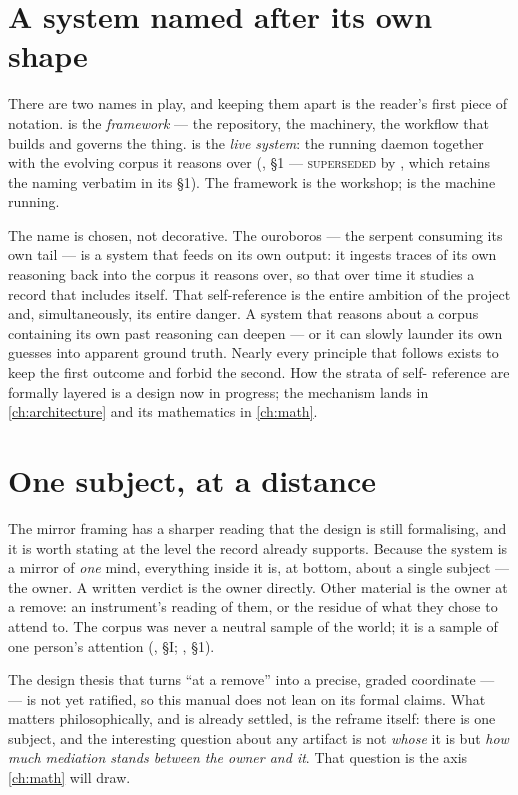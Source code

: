 \section{A system named after its own shape}
\label{sec:ouroboros}

There are two names in play, and keeping them apart is the reader's first piece of
notation. \mindpalace{} is the \emph{framework} --- the repository, the machinery,
the workflow that builds and governs the thing. \Ouroboros{} is the \emph{live
system}: the running daemon together with the evolving corpus it reasons over
(, \S 1 --- \textsc{superseded} by
, which retains the naming verbatim in its \S 1).
The framework is the workshop; \Ouroboros{} is the machine running.

The name is chosen, not decorative. The ouroboros --- the serpent consuming its
own tail --- is a system that feeds on its own output: it ingests traces of its own
reasoning back into the corpus it reasons over, so that over time it studies a
record that includes itself. That self-reference is the entire ambition of the
project and, simultaneously, its entire danger. A system that reasons about a
corpus containing its own past reasoning can deepen --- or it can slowly launder
its own guesses into apparent ground truth. Nearly every principle that follows
exists to keep the first outcome and forbid the second. How the strata of self-
reference are formally layered is a design now in progress; the mechanism lands in
\autoref{ch:architecture} and its mathematics in \autoref{ch:math}.

\section{One subject, at a distance}
\label{sec:one-subject}

The mirror framing has a sharper reading that the design is still formalising, and
it is worth stating at the level the record already supports. Because the system is
a mirror of \emph{one} mind, everything inside it is, at bottom, about a single
subject --- the owner. A written verdict is the owner directly. Other material is
the owner at a remove: an instrument's reading of them, or the residue of what they
chose to attend to. The corpus was never a neutral sample of the world; it is a
sample of one person's attention (, \S I;
, \S 1).

The design thesis that turns ``at a remove'' into a precise, graded coordinate ---
 --- is not yet ratified, so this manual
does not lean on its formal claims. What matters philosophically, and is already
settled, is the reframe itself: there is one subject, and the interesting question
about any artifact is not \emph{whose} it is but \emph{how much mediation stands
between the owner and it}. That question is the axis \autoref{ch:math} will draw.

